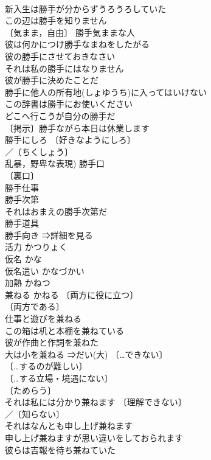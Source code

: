 \documentclass[8pt]{extreport}
\begin{document}
\begin{CJK}{UTF8}{min}
\\	新入生は勝手が分からずうろうろしていた 
\\	この辺は勝手を知りません 
\\	〔気まま，自由〕 勝手気ままな人 
\\	彼は何かにつけ勝手なまねをしたがる 
\\	彼の勝手にさせておきなさい 
\\	それは私の勝手にはなりません 
\\	彼が勝手に決めたことだ 
\\	勝手に他人の所有地(しょゆうち)に入ってはいけない 
\\	この辞書は勝手にお使いください 
\\	どこへ行こうが自分の勝手だ 
\\	〔掲示〕勝手ながら本日は休業します 
\\	勝手にしろ 〔好きなようにしろ〕
\\	／〔ちくしょう〕
\\	乱暴，野卑な表現) 勝手口 
\\	〔裏口〕
\\	勝手仕事 
\\	勝手次第 
\\	それはおまえの勝手次第だ 
\\	勝手道具 
\\	勝手向き ⇒詳細を見る
\\	活力	かつりょく	
\\	仮名	かな	
\\	仮名遣い	かなづかい	
\\	加熱	かねつ	
\\	兼ねる	かねる	〔両方に役に立つ〕
\\	〔両方である〕
\\	仕事と遊びを兼ねる 
\\	この箱は机と本棚を兼ねている 
\\	彼が作曲と作詞を兼ねた 
\\	大は小を兼ねる ⇒だい(大) 〔…できない〕
\\	〔…するのが難しい〕
\\	〔…する立場・境遇にない〕
\\	〔ためらう〕
\\	それは私には分かり兼ねます 〔理解できない〕
\\	／〔知らない〕
\\	それはなんとも申し上げ兼ねます 
\\	申し上げ兼ねますが思い違いをしておられます 
\\	彼らは吉報を待ち兼ねていた 

\end{CJK}
\end{document}
